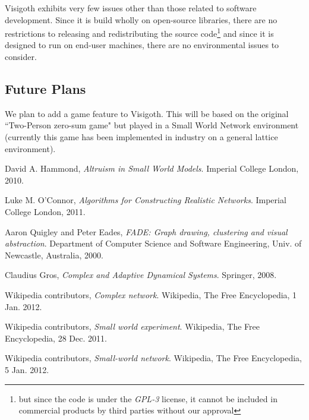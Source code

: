 \documentclass[a4paper,11pt,titlepage]{article}
\newcommand{\buzz}[1]{\emph{#1}}
\begin{document}
Visigoth exhibits very few issues other than those related to software
development. Since it is build wholly on open-source libraries, there
are no restrictions to releasing and redistributing the source
code\footnote{but since the code is under the \buzz{GPL-3} license,
  it cannot be included in commercial products by third parties
  without our approval} and since it is designed to run on end-user
machines, there are no environmental issues to consider.

\subsection{Future Plans}

We plan to add a game feature to Visigoth. This will be based on the
original ``Two-Person zero-sum game" but played in a Small World
Network environment (currently this game has been implemented in 
industry on a general lattice environment).

\begin{thebibliography}{9}

  David A. Hammond,
  \emph{Altruism in Small World Models}.
  Imperial College London,
  2010.

  Luke M. O'Connor,
  \emph{Algorithms for Constructing Realistic Networks}.
  Imperial College London,
  2011.

  Aaron Quigley and Peter Eades,
  \emph{FADE: Graph drawing, clustering and visual abstraction}.
  Department of Computer Science and Software Engineering,
  Univ. of  Newcastle, Australia, 2000.

  Claudius Gros,
  \emph{Complex and Adaptive Dynamical Systems}.
  Springer,
  2008.

  Wikipedia contributors,
  \emph{Complex network}.
  Wikipedia, The Free Encyclopedia, 1 Jan. 2012.

  Wikipedia contributors,
  \emph{Small world experiment}.
  Wikipedia, The Free Encyclopedia, 28 Dec. 2011.

  Wikipedia contributors,
  \emph{Small-world network}.
  Wikipedia, The Free Encyclopedia, 5 Jan. 2012.

\end{thebibliography}
\end{document}
